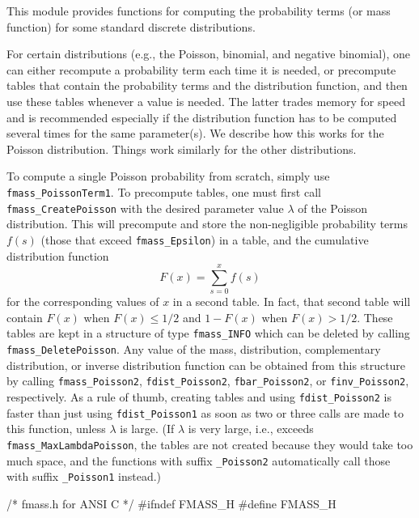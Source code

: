 
This module provides functions for computing the probability terms
(or mass function) for some standard discrete distributions.

For certain distributions (e.g., the Poisson, binomial, and negative
binomial), one can either recompute a probability term each time 
it is needed, or precompute tables that contain the probability terms
and the distribution function, and then use these tables whenever a 
value is needed.  The latter trades memory for speed and is recommended
especially if the distribution function has to be computed several times
for the same parameter(s).
We describe how this works for the Poisson distribution.
Things work similarly for the other distributions.

To compute a single Poisson probability from scratch, simply use
 {\tt fmass\_PoissonTerm1}.
To precompute tables, one must first call {\tt fmass\_CreatePoisson}
with the desired parameter value $\lambda$ of the Poisson distribution.
This will precompute and store the non-negligible probability terms
$f(s)$ (those that exceed {\tt fmass\_Epsilon}) in a table,
and the cumulative distribution function 
\[
  F(x) = \sum_{s=0}^x f(s)
\]
for the corresponding values of $x$ in a second table.
In fact, that second table will contain $F(x)$ when $F(x) \le 1/2$
and $1-F(x)$ when $F(x) > 1/2$.
These tables are kept in a structure of type {\tt fmass\_INFO}
which can be deleted by calling {\tt fmass\_DeletePoisson}.
Any value of the mass, distribution, complementary distribution,
or inverse distribution function
 can be obtained from this structure
by calling {\tt fmass\_Poisson2}, {\tt fdist\_Poisson2},
{\tt fbar\_Poisson2}, or {\tt finv\_Poisson2}, respectively.
As a rule of thumb, creating tables and using {\tt fdist\_Poisson2} 
is faster than just using {\tt fdist\_Poisson1} as soon as two or three
calls are made to this function, unless $\lambda$ is large.
(If $\lambda$ is very large, 
\ifdetailed  %
i.e., exceeds {\tt fmass\_MaxLambdaPoisson}, 
\fi %
the tables are not created 
because they would take too much space, and the functions with suffix 
{\tt \_Poisson2} automatically call those with suffix {\tt \_Poisson1} 
instead.)


\code\hide
/* fmass.h for ANSI C */
#ifndef FMASS_H
#define FMASS_H
\endhide\endcode

\code


